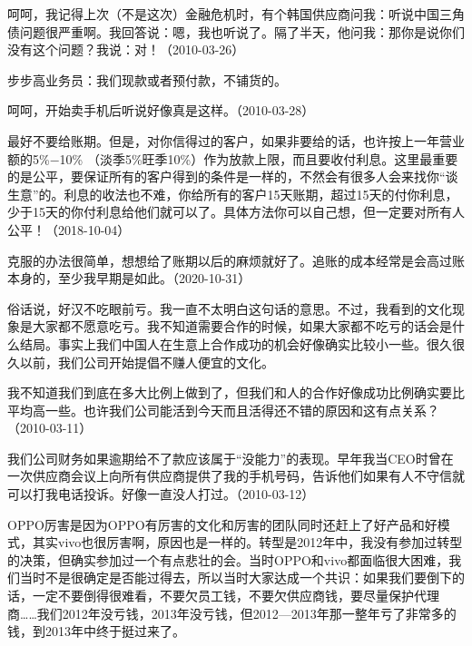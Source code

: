 呵呵，我记得上次（不是这次）金融危机时，有个韩国供应商问我：听说中国三角债问题很严重啊。我回答说：嗯，我也听说了。隔了半天，他问我：那你是说你们没有这个问题？我说：对！（2010-03-26）

步步高业务员：我们现款或者预付款，不铺货的。

呵呵，开始卖手机后听说好像真是这样。（2010-03-28）


最好不要给账期。但是，对你信得过的客户，如果非要给的话，也许按上一年营业额的5\%\( - \)10\% （淡季5\%旺季10\%）作为放款上限，而且要收付利息。这里最重要的是公平，要保证所有的客户得到的条件是一样的，不然会有很多人会来找你“谈生意”的。利息的收法也不难，你给所有的客户15天账期，超过15天的付你利息，少于15天的你付利息给他们就可以了。具体方法你可以自己想，但一定要对所有人公平！（2018-10-04）


克服的办法很简单，想想给了账期以后的麻烦就好了。追账的成本经常是会高过账本身的，至少我早期是如此。（2020-10-31）


俗话说，好汉不吃眼前亏。我一直不太明白这句话的意思。不过，我看到的文化现象是大家都不愿意吃亏。我不知道需要合作的时候，如果大家都不吃亏的话会是什么结局。事实上我们中国人在生意上合作成功的机会好像确实比较小一些。很久很久以前，我们公司开始提倡不赚人便宜的文化。

我不知道我们到底在多大比例上做到了，但我们和人的合作好像成功比例确实要比平均高一些。也许我们公司能活到今天而且活得还不错的原因和这有点关系？（2010-03-11）

我们公司财务如果逾期给不了款应该属于“没能力”的表现。早年我当CEO时曾在一次供应商会议上向所有供应商提供了我的手机号码，告诉他们如果有人不守信就可以打我电话投诉。好像一直没人打过。（2010-03-12）

OPPO厉害是因为OPPO有厉害的文化和厉害的团队同时还赶上了好产品和好模式，其实vivo也很厉害啊，原因也是一样的。转型是2012年中，我没有参加过转型的决策，但确实参加过一个有点悲壮的会。当时OPPO和vivo都面临很大困难，我们当时不是很确定是否能过得去，所以当时大家达成一个共识：如果我们要倒下的话，一定不要倒得很难看，不要欠员工钱，不要欠供应商钱，要尽量保护代理商……我们2012年没亏钱，2013年没亏钱，但2012—2013年那一整年亏了非常多的钱，到2013年中终于挺过来了。


